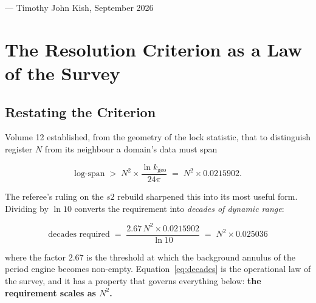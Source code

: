 \documentclass[11pt, letterpaper, openany]{book}
\newcommand{\kgeo}{k_{\mathrm{geo}}}
\begin{document}
\vspace{1em}
\noindent\hfill --- Timothy John Kish, September 2026

\chapter{The Resolution Criterion as a Law of the Survey}

\section{Restating the Criterion}

Volume 12 established, from the geometry of the lock statistic, that to distinguish register
$N$ from its neighbour a domain's data must span

\begin{equation}
\text{log-span} \;>\; N^2 \times \frac{\ln \kgeo}{24\pi} \;=\; N^2 \times 0.0215902 .
\label{eq:res}
\end{equation}

The referee's ruling on the $s2$ rebuild sharpened this into its most useful form. Dividing by
$\ln 10$ converts the requirement into \emph{decades of dynamic range}:

\begin{equation}
\boxed{\ \text{decades required} \;=\; \frac{2.67\, N^2 \times 0.0215902}{\ln 10}
\;=\; N^2 \times 0.025036\ }
\label{eq:decades}
\end{equation}

where the factor $2.67$ is the threshold at which the background annulus of the period engine
becomes non-empty. Equation~\ref{eq:decades} is the operational law of the survey, and it has a
property that governs everything below: \textbf{the requirement scales as $N^2$.}
\end{document}
